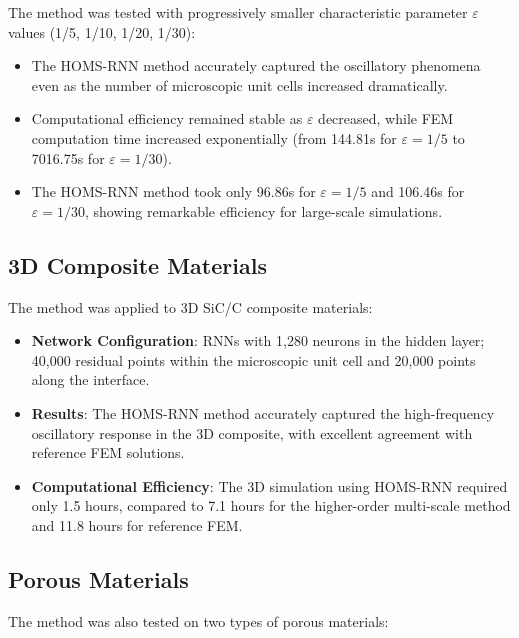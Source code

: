 \documentclass[11pt]{article}
\begin{document}
The method was tested with progressively smaller characteristic parameter $\varepsilon$ values (1/5, 1/10, 1/20, 1/30):

\begin{itemize}
    \item The HOMS-RNN method accurately captured the oscillatory phenomena even as the number of microscopic unit cells increased dramatically.
    
    \item Computational efficiency remained stable as $\varepsilon$ decreased, while FEM computation time increased exponentially (from 144.81s for $\varepsilon=1/5$ to 7016.75s for $\varepsilon=1/30$).
    
    \item The HOMS-RNN method took only 96.86s for $\varepsilon=1/5$ and 106.46s for $\varepsilon=1/30$, showing remarkable efficiency for large-scale simulations.
\end{itemize}

\subsection{3D Composite Materials}

The method was applied to 3D SiC/C composite materials:

\begin{itemize}
    \item \textbf{Network Configuration}: RNNs with 1,280 neurons in the hidden layer; 40,000 residual points within the microscopic unit cell and 20,000 points along the interface.
    
    \item \textbf{Results}: The HOMS-RNN method accurately captured the high-frequency oscillatory response in the 3D composite, with excellent agreement with reference FEM solutions.
    
    \item \textbf{Computational Efficiency}: The 3D simulation using HOMS-RNN required only 1.5 hours, compared to 7.1 hours for the higher-order multi-scale method and 11.8 hours for reference FEM.
\end{itemize}

\subsection{Porous Materials}

The method was also tested on two types of porous materials:
\end{document}
